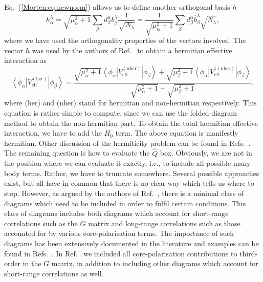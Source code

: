 Eq.~(\ref{Morten:eq:newnorm}) allows us to define another
orthogonal basis $h$
\begin{equation}
  h_{\alpha}^{\lambda}=\sqrt{\mu_{\alpha}^2+1}\sum_{\beta}
  d_{\beta}^{\alpha}b_{\beta}^{\lambda}\frac{1}{\sqrt{N_{\lambda}}}
  =\frac{1}{\sqrt{\mu_{\alpha}^2+1}}\sum_{\beta}
  d_{\beta}^{\alpha}\overline{b}_{\beta}^{\lambda}\sqrt{N_{\lambda}},
  \label{Morten:eq:hbasis}
\end{equation}
where we have used the orthogonality properties of the vectors
involved. The vector $h$ was used by the authors of
Ref.~ to obtain a hermitian effective
interaction as
\begin{equation}
   \left\langle \phi_{\alpha}\right |
   V_{\mathrm{eff}}^{\mathrm{(her)}}\left | \phi_{\beta}\right\rangle=
   \frac{\sqrt{\mu_{\alpha}^2+1}\left\langle \phi_{\alpha} \right |
   V_{\mathrm{eff}}^{\mathrm{(nher)}}\left | \phi_{\beta}\right\rangle
   +\sqrt{\mu_{\beta}^2+1}\left\langle \phi_{\alpha}\right |
   V_{\mathrm{eff}}^{\dagger\mathrm{(nher)}}\left |
   \phi_{\beta} \right\rangle}
   {\sqrt{\mu_{\alpha}^2+1}+\sqrt{\mu_{\beta}^2+1} },
   \label{Morten:eq:hermitian}
\end{equation}
where (her) and (nher) stand for hermitian and non-hermitian
respectively. 
This equation is rather simple to compute, since
we can use the folded-diagram method
to obtain the non-hermitian part.
To obtain the total hermitian effective interaction, we have to
add the $H_0$ term. The above equation is manifestly hermitian.
Other discussion of the hermiticity problem can be found
in Refs.~.
The remaining question is how to evaluate the $\hat{Q}$ box. 
Obviously, we are not in the position where we can evaluate it
exactly, i.e., to include all possible many-body terms.
Rather, we have to truncate somewhere. 
Several possible approaches exist, but all have in common that
there is no clear way which tells us where to stop.
However, as argued by the authors of Ref.~, there is a
minimal class of diagrams which need to be included 
in order to fulfil certain conditions. This class
of diagrams includes both diagrams which account for short-range
correlations such as the $G$ matrix and long-range
correlations such as those accounted for by various 
core-polarisation terms. 
The importance of such diagrams has been extensively documented
in the literature and examples can be found
in Refs.~. In Ref.~ we included
all core-polarisation contributions to third-order
in the $G$ matrix, in addition to including other diagrams
which account for short-range correlations as well. 

